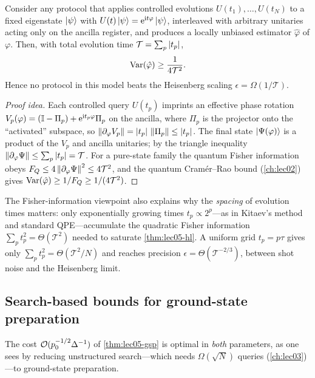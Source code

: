 \begin{theorem}
\label{thm:lec05-hl}
Consider any protocol that applies controlled evolutions $U(t_1),\dots,U(t_N)$ to
a fixed eigenstate $\ket{\psi}$ with $U(t)\ket{\psi}=\mathrm{e}^{\mathrm{i} t\varphi}\ket{\psi}$,
interleaved with arbitrary unitaries acting only on the ancilla register, and
produces a locally unbiased estimator $\hat\varphi$ of $\varphi$. Then, with total
evolution time $\mathcal T=\sum_p\left\lvert t_p \right\rvert$,
\[
  \operatorname{Var}(\hat\varphi)\ge\frac{1}{4\mathcal T^{2}}.
\]
Hence no protocol in this model beats the Heisenberg scaling
$\epsilon=\Omega(1/\mathcal T)$.
\end{theorem}

\begin{proof}[Proof idea]
Each controlled query $U(t_p)$ imprints an effective phase rotation
$V_p(\varphi)=(\mathbb{I}-\Pi_p)+\mathrm{e}^{\mathrm{i} t_p\varphi}\Pi_p$ on the ancilla, where $\Pi_p$
is the projector onto the ``activated'' subspace, so
$\left\lVert \partial_\varphi V_p \right\rVert=\left\lvert t_p \right\rvert\,\left\lVert \Pi_p \right\rVert\le\left\lvert t_p \right\rvert$. The final state
$\ket{\Psi(\varphi)}$ is a product of the $V_p$ and ancilla unitaries; by the
triangle inequality $\left\lVert \partial_\varphi\Psi \right\rVert\le\sum_p\left\lvert t_p \right\rvert=\mathcal T$. For
a pure-state family the quantum Fisher information obeys
$F_Q\le4\left\lVert \partial_\varphi\Psi \right\rVert^2\le4\mathcal T^2$, and the quantum
Cram\'er--Rao bound (\cref{ch:lec02}) gives
$\operatorname{Var}(\hat\varphi)\ge1/F_Q\ge1/(4\mathcal T^2)$.
\end{proof}

The Fisher-information viewpoint also explains why the \emph{spacing} of evolution
times matters: only exponentially growing times $t_p\propto2^{p}$---as in Kitaev's
method and standard QPE---accumulate the quadratic Fisher information
$\sum_p t_p^2=\Theta(\mathcal T^2)$ needed to saturate
\cref{thm:lec05-hl}. A uniform grid $t_p=p\tau$ gives only
$\sum_p t_p^2=\Theta(\mathcal T^{2}/N)$ and reaches precision
$\epsilon=\Theta(\mathcal T^{-2/3})$, between shot noise and the Heisenberg limit.

\subsection*{Search-based bounds for ground-state preparation}

The cost $\mathcal{O}(p_0^{-1/2}\Delta^{-1})$ of \cref{thm:lec05-gsp} is optimal in
\emph{both} parameters, as one sees by reducing unstructured search---which needs
$\Omega(\sqrt N)$ queries (\cref{ch:lec03})---to ground-state preparation.

